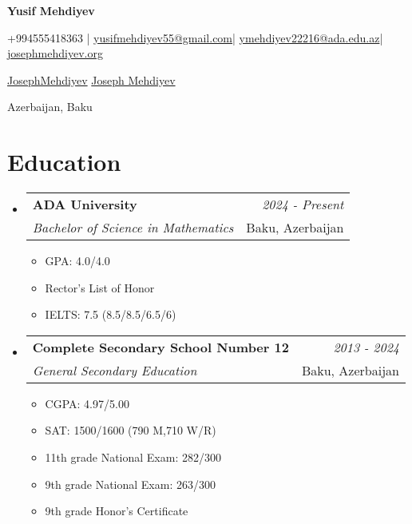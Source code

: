 \documentclass[a4paper,11pt]{article}
\makeatletter
\newcommand{\resumeSubheading}[4]{
    \vspace{0.5mm}
\item
    \begin{tabular*}{0.98\textwidth}[t]{l@{\extracolsep{\fill}}r}
        \textbf{#1} & \textit{\footnotesize{#4}} \\
        \textit{\footnotesize{#3}} &  \footnotesize{#2}\\
    \end{tabular*}
    \vspace{-2.4mm}
}
\newcommand{\resumeSubHeadingListStart}{
\begin{itemize}[leftmargin=*,labelsep=1mm]}
\newcommand{\resumeItemListStart}{
                \begin{itemize}[leftmargin=*,labelsep=1mm,itemsep=0.5mm]}
\newcommand{\resumeSubHeadingListEnd}{
                    \end{itemize}\vspace{2mm}}
\newcommand{\resumeItemListEnd}{
    \end{itemize}\vspace{-2mm}}
\newcommand{\socialicon}[1]{\raisebox{-0.05em}{\resizebox{!}{1em}{#1}}}
\newcommand{\headerfontiii}{\fontfamily{ppl}\selectfont} %
\makeatother
\begin{document}
\headerfontiii

\begin{center}
    {\Huge\textbf{Yusif Mehdiyev}}
\end{center}
\vspace{-5mm}

\begin{center}
    \small{
        +994555418363 | \href{mailto:yusifmehdiyev55@gmail.com}{yusifmehdiyev55@gmail.com}|
        \href{mailto:ymehdiyev22216@ada.edu.az}{ymehdiyev22216@ada.edu.az}|
        \href{https://josephmehdiyev.org/}{josephmehdiyev.org}
    }
\end{center}
\vspace{-5mm}

\begin{center}
    \small{
        \socialicon{\faGithub} \href{https://github.com/JosephMehdiyev}{JosephMehdiyev}
        \socialicon{\faLinkedin} \href{https://www.linkedin.com/in/joseph-mehdiyev-6155982ab/} {Joseph Mehdiyev}
    }
\end{center}
\vspace{-5mm}
\begin{center}
    \small{Azerbaijan, Baku}
\end{center}

\vspace{-4mm}

\vspace{-2mm}

\section{\textbf{Education}}
\vspace{-0.4mm}
\resumeSubHeadingListStart

\resumeSubheading
{ADA University}{Baku, Azerbaijan}
{Bachelor of Science in Mathematics}{2024 - Present}
\resumeItemListStart
\item GPA: 4.0/4.0
\item Rector’s List of Honor
\item IELTS: 7.5 (8.5/8.5/6.5/6)
\resumeItemListEnd

\resumeSubheading
{Complete Secondary School Number 12}{Baku, Azerbaijan}
{General Secondary Education}{2013 - 2024}
\resumeItemListStart
\item CGPA: 4.97/5.00
\item SAT: 1500/1600 (790 M,710 W/R)
\item 11th grade National Exam: 282/300
\item 9th grade National Exam: 263/300
\item 9th grade Honor's Certificate
\resumeItemListEnd
\resumeSubHeadingListEnd
\vspace{-6mm}
\end{document}
